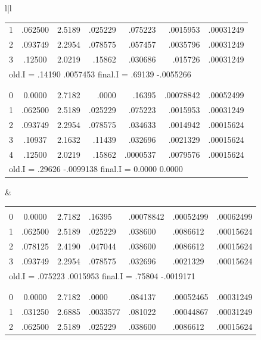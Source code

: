 \begin{figure}[H]
\begin{tabular}{l|l}
\begin{tabular}{ccrrrrr}
            1 & .062500 & 2.5189 & .025229 & .075223 & .0015953  & .00031249 \\
            2 & .093749 & 2.2954 & .078575 & .057457 & .0035796  & .00031249 \\
            3 & .12500  & 2.0219 & .15862  & .030686 & .015726   & .00031249 \\
            \multicolumn{7}{l}{old.I = .14190 .0057453 \hfill final.I = .69139 -.0055266} \\
        \\
            \Agrandheader \\
            0 & 0.0000  & 2.7182 & .0000   & .16395   & .00078842 & .00052499 \\
            1 & .062500 & 2.5189 & .025229 & .075223  & .0015953  & .00031249 \\
            2 & .093749 & 2.2954 & .078575 & .034633  & .0014942  & .00015624 \\
            3 & .10937  & 2.1632 & .11439  & .032696  & .0021329  & .00015624 \\
            4 & .12500  & 2.0219 & .15862  & .0000537 & .0079576  & .00015624 \\
            \multicolumn{7}{l}{old.I = .29626 -.0099138 \hfill final.I = 0.0000 0.0000}
        \end{tabular}
      &
        \begin{tabular}{cccllll}
            \Agrandheader \\
            0 & 0.0000  & 2.7182 & .16395  & .00078842 & .00052499 & .00062499 \\
            1 & .062500 & 2.5189 & .025229 & .038600   & .0086612  & .00015624 \\
            2 & .078125 & 2.4190 & .047044 & .038600   & .0086612  & .00015624 \\
            3 & .093749 & 2.2954 & .078575 & .032696   & .0021329  & .00015624 \\
            \multicolumn{7}{l}{old.I = .075223 .0015953 \hfill final.I = .75804 -.0019171} \\
        \\
            \Agrandheader \\
            0 & 0.0000  & 2.7182 & .0000    & .084137 & .00052465 & .00031249 \\
            1 & .031250 & 2.6885 & .0033577 & .081022 & .00044867 & .00031249 \\
            2 & .062500 & 2.5189 & .025229  & .038600 & .0086612  & .00015624 \\

\end{tabular}
\end{tabular}
\end{figure}
